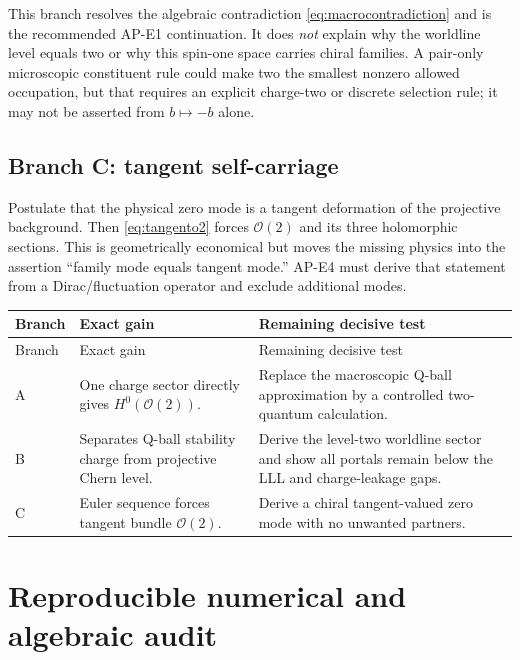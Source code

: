 \documentclass[11pt]{article}
\numberwithin{equation}{section}
\newcommand{\cO}{\mathcal O}
\begin{document}
This branch resolves the algebraic contradiction \eqref{eq:macrocontradiction}
and is the recommended AP-E1 continuation.  It does \emph{not} explain why the
worldline level equals two or why this spin-one space carries chiral families.
A pair-only microscopic constituent rule could make two the smallest nonzero
allowed occupation, but that requires an explicit charge-two or discrete
selection rule; it may not be asserted from \(b\mapsto-b\) alone.

\subsection{Branch C: tangent self-carriage}

Postulate that the physical zero mode is a tangent deformation of the
projective background.  Then \eqref{eq:tangento2} forces \(\cO(2)\) and its
three holomorphic sections.  This is geometrically economical but moves the
missing physics into the assertion ``family mode equals tangent mode.''  AP-E4
must derive that statement from a Dirac/fluctuation operator and exclude
additional modes.

\begin{longtable}{>{\raggedright\arraybackslash}p{}
                  >{\raggedright\arraybackslash}p{}
                  >{\raggedright\arraybackslash}p{}}
\toprule
Branch & Exact gain & Remaining decisive test \\
\midrule
\endfirsthead
\toprule
Branch & Exact gain & Remaining decisive test \\
\midrule
\endhead
A & One charge sector directly gives \(H^0(\cO(2))\). & Replace the
macroscopic Q-ball approximation by a controlled two-quantum calculation.\\
B & Separates Q-ball stability charge from projective Chern level. & Derive
the level-two worldline sector and show all portals remain below the LLL and
charge-leakage gaps.\\
C & Euler sequence forces tangent bundle \(\cO(2)\). & Derive a chiral
tangent-valued zero mode with no unwanted partners.\\
\bottomrule
\end{longtable}

\section{Reproducible numerical and algebraic audit}
\end{document}
